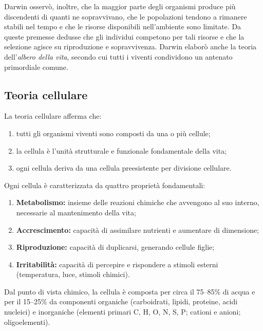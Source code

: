 \documentclass[11pt,a4paper,openright,twoside]{book}
\theoremstyle{definition}
\theoremstyle{plain}
\theoremstyle{remark}
\begin{document}
Darwin osservò, inoltre, che la maggior parte degli organismi produce più discendenti di quanti ne sopravvivano, che le popolazioni tendono a rimanere stabili nel tempo e che le risorse disponibili nell'ambiente sono limitate. Da queste premesse dedusse che gli individui competono per tali risorse e che la selezione agisce su riproduzione e sopravvivenza. Darwin elaborò anche la teoria dell'\textit{albero della vita}, secondo cui tutti i viventi condividono un antenato primordiale comune.

\subsection{Teoria cellulare}

\begin{tcolorbox}[defbox, title={Teoria cellulare}]
  La teoria cellulare afferma che:
  \begin{enumerate}
    \item tutti gli organismi viventi sono composti da una o più cellule;
    \item la cellula è l'unità strutturale e funzionale fondamentale della vita;
    \item ogni cellula deriva da una cellula preesistente per divisione cellulare.
  \end{enumerate}
\end{tcolorbox}

Ogni cellula è caratterizzata da quattro proprietà fondamentali:
\begin{enumerate}
  \item \textbf{Metabolismo:} insieme delle reazioni chimiche che avvengono al suo interno, necessarie al mantenimento della vita;
  \item \textbf{Accrescimento:} capacità di assimilare nutrienti e aumentare di dimensione;
  \item \textbf{Riproduzione:} capacità di duplicarsi, generando cellule figlie;
  \item \textbf{Irritabilità:} capacità di percepire e rispondere a stimoli esterni (temperatura, luce, stimoli chimici).
\end{enumerate}

Dal punto di vista chimico, la cellula è composta per circa il 75--85\% di acqua e per il 15--25\% da componenti organiche (carboidrati, lipidi, proteine, acidi nucleici) e inorganiche (elementi primari C, H, O, N, S, P; cationi e anioni; oligoelementi).
\end{document}
